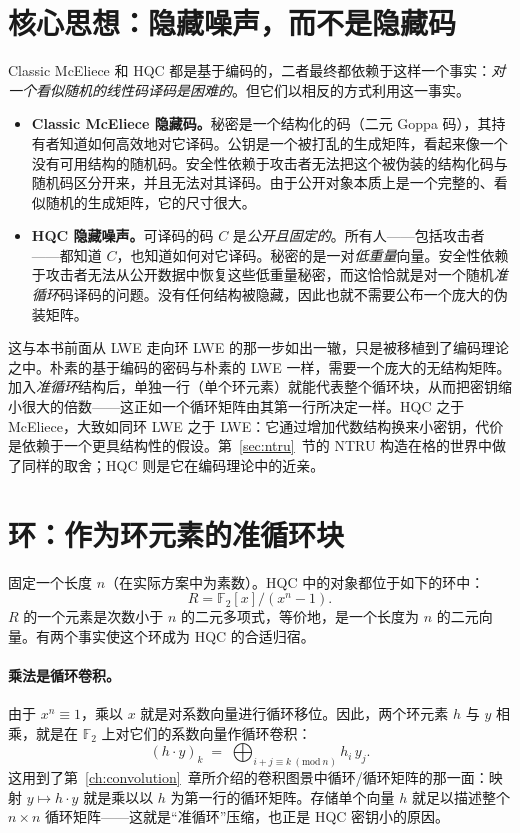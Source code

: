 \section{核心思想：隐藏噪声，而不是隐藏码}

Classic McEliece 和 HQC 都是基于编码的，二者最终都依赖于这样一个事实：\emph{对一个看似随机的线性码译码是困难的}。但它们以相反的方式利用这一事实。

\begin{itemize}
  \item \textbf{Classic McEliece 隐藏码。}秘密是一个结构化的码（二元 Goppa 码），其持有者知道如何高效地对它译码。公钥是一个被打乱的生成矩阵，看起来像一个没有可用结构的随机码。安全性依赖于攻击者无法把这个被伪装的结构化码与随机码区分开来，并且无法对其译码。由于公开对象本质上是一个完整的、看似随机的生成矩阵，它的尺寸很大。
  \item \textbf{HQC 隐藏噪声。}可译码的码 $C$ 是\emph{公开且固定的}。所有人——包括攻击者——都知道 $C$，也知道如何对它译码。秘密的是一对\emph{低重量}向量。安全性依赖于攻击者无法从公开数据中恢复这些低重量秘密，而这恰恰就是对一个随机\emph{准循环}码译码的问题。没有任何结构被隐藏，因此也就不需要公布一个庞大的伪装矩阵。
\end{itemize}

这与本书前面从 LWE 走向环 LWE 的那一步如出一辙，只是被移植到了编码理论之中。朴素的基于编码的密码与朴素的 LWE 一样，需要一个庞大的无结构矩阵。加入\emph{准循环}结构后，单独一行（单个环元素）就能代表整个循环块，从而把密钥缩小很大的倍数——这正如一个循环矩阵由其第一行所决定一样。HQC 之于 McEliece，大致如同环 LWE 之于 LWE：它通过增加代数结构换来小密钥，代价是依赖于一个更具结构性的假设。第~\ref{sec:ntru}~节的 NTRU 构造在格的世界中做了同样的取舍；HQC 则是它在编码理论中的近亲。

\section{环：作为环元素的准循环块}

固定一个长度 $n$（在实际方案中为素数）。HQC 中的对象都位于如下的环中：
\[
R = \mathbb{F}_2[x]\big/(x^n-1).
\]
$R$ 的一个元素是次数小于 $n$ 的二元多项式，等价地，是一个长度为 $n$ 的二元向量。有两个事实使这个环成为 HQC 的合适归宿。

\paragraph{乘法是循环卷积。}由于 $x^n \equiv 1$，乘以 $x$ 就是对系数向量进行循环移位。因此，两个环元素 $h$ 与 $y$ 相乘，就是在 $\mathbb{F}_2$ 上对它们的系数向量作循环卷积：
\[
(h\cdot y)_k \;=\; \bigoplus_{i+j\equiv k \ (\mathrm{mod}\ n)} h_i\, y_j .
\]
这用到了第~\ref{ch:convolution}~章所介绍的卷积图景中循环/循环矩阵的那一面：映射 $y \mapsto h\cdot y$ 就是乘以以 $h$ 为第一行的循环矩阵。存储单个向量 $h$ 就足以描述整个 $n\times n$ 循环矩阵——这就是“准循环”压缩，也正是 HQC 密钥小的原因。

